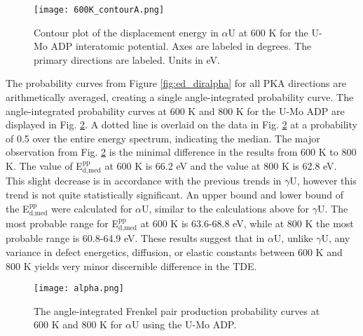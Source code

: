 \documentclass[review]{elsarticle}
\begin{document}
\begin{figure}[h]
 \centering
 \texttt{[image: 600K\_contourA.png]} 
 \caption{Contour plot of the displacement energy in $\alpha$U at 600 K for the U-Mo ADP interatomic potential. Axes are labeled in degrees. The primary directions are labeled. Units in eV.}
 \label{fig:600Kcontour}
\end{figure}

\FloatBarrier

The probability curves from Figure \ref{fig:ed_diralpha} for all PKA directions are arithmetically averaged, creating a single angle-integrated probability curve. The angle-integrated probability curves at 600 K and 800 K for the U-Mo ADP are displayed in Fig. \ref{fig:alpha}. A dotted line is overlaid on the data in Fig. \ref{fig:alpha} at a probability of 0.5 over the entire energy spectrum, indicating the median. The major observation from Fig. \ref{fig:alpha} is the minimal difference in the results from 600 K to 800 K. The value of E$^{\textrm{pp}}_{\textrm{d,med}}$ at 600 K is 66.2 eV and the value at 800 K is 62.8 eV. This slight decrease is in accordance with the previous trends in $\gamma$U, however this trend is not quite statistically significant. An upper bound and lower bound of the E$^{\textrm{pp}}_{\textrm{d,med}}$ were calculated for $\alpha$U, similar to the calculations above for $\gamma$U. The most probable range for E$^{\textrm{pp}}_{\textrm{d,med}}$ at 600 K is 63.6-68.8 eV, while at 800 K the most probable range is 60.8-64.9 eV. These results suggest that in $\alpha$U, unlike $\gamma$U, any variance in defect energetics, diffusion, or elastic constants between 600 K and 800 K yields very minor discernible difference in the TDE.

\begin{figure}[h]
 \centering
 \texttt{[image: alpha.png]} 	
 \caption{The angle-integrated Frenkel pair production probability curves at 600 K and 800 K for $\alpha$U using the U-Mo ADP.}
 \label{fig:alpha}
\end{figure}

\FloatBarrier
\end{document}
